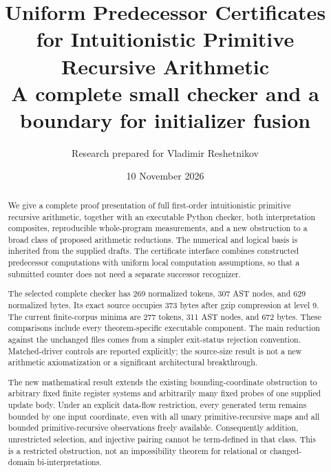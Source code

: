 \documentclass[11pt,letterpaper]{article}
\title{\color{ink}\bfseries Uniform Predecessor Certificates\\for Intuitionistic Primitive Recursive Arithmetic\\[7pt]
\large A complete small checker and a boundary for initializer fusion}
\author{Research prepared for Vladimir Reshetnikov}
\date{10 November 2026}
\theoremstyle{definition}\newtheorem{definition}[theorem]{Definition}
\theoremstyle{remark}\newtheorem{remark}[theorem]{Remark}
\newcommand{\PrimaryTokens}{269}
\newcommand{\PrimaryAST}{307}
\newcommand{\PrimaryBytes}{629}
\newcommand{\PrimaryGzip}{373}
\begin{document}
\maketitle
\begin{abstract}
We give a complete proof presentation of full first-order intuitionistic
primitive recursive arithmetic, together with an executable Python checker,
both interpretation composites, reproducible whole-program measurements,
and a new obstruction to a broad class of proposed arithmetic reductions.
The numerical and logical basis is inherited from the supplied drafts.
The certificate interface combines constructed predecessor computations
with uniform local computation assumptions, so that a submitted counter
does not need a separate successor recognizer.

The selected complete checker has \PrimaryTokens{} normalized tokens,
\PrimaryAST{} AST nodes, and \PrimaryBytes{} normalized bytes. Its exact
source occupies \PrimaryGzip{} bytes after gzip compression at level 9.
The current finite-corpus minima are 277 tokens, 311 AST nodes, and 672
bytes. These comparisons include every theorem-specific executable
component. The main reduction against the unchanged files comes from a
simpler exit-status rejection convention. Matched-driver controls are
reported explicitly; the source-size result is not a new arithmetic
axiomatization or a significant architectural breakthrough.

The new mathematical result extends the existing bounding-coordinate
obstruction to arbitrary fixed finite register systems and arbitrarily
many fixed probes of one supplied update body. Under an explicit data-flow
restriction, every generated term remains bounded by one input coordinate,
even with all unary primitive-recursive maps and all bounded
primitive-recursive observations freely available. Consequently addition,
unrestricted selection, and injective pairing cannot be term-defined in
that class. This is a restricted obstruction, not an impossibility theorem
for relational or changed-domain bi-interpretations.
\end{abstract}
\begin{center}
\end{center}
\clearpage
\setcounter{tocdepth}{1}\tableofcontents
\clearpage
\end{document}
